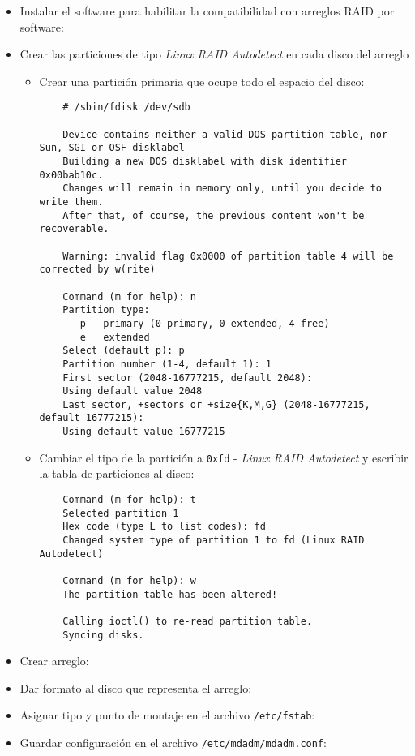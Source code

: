 \begin{itemize}
  \item Instalar el software para habilitar la compatibilidad con arreglos \textsc{RAID} por software:
  \item Crear las particiones de tipo \textit{Linux RAID Autodetect} en cada disco del arreglo
    \begin{itemize}
      \item Crear una partici\'{o}n primaria que ocupe todo el espacio del disco:

{
\scriptsize
\linespread{1}
\begin{verbatim}
    # /sbin/fdisk /dev/sdb

    Device contains neither a valid DOS partition table, nor Sun, SGI or OSF disklabel
    Building a new DOS disklabel with disk identifier 0x00bab10c.
    Changes will remain in memory only, until you decide to write them.
    After that, of course, the previous content won't be recoverable.

    Warning: invalid flag 0x0000 of partition table 4 will be corrected by w(rite)

    Command (m for help): n
    Partition type:
       p   primary (0 primary, 0 extended, 4 free)
       e   extended
    Select (default p): p
    Partition number (1-4, default 1): 1
    First sector (2048-16777215, default 2048):
    Using default value 2048
    Last sector, +sectors or +size{K,M,G} (2048-16777215, default 16777215):
    Using default value 16777215
\end{verbatim}
}

      \item Cambiar el tipo de la partici\'{o}n a \texttt{0xfd} - \textit{Linux RAID Autodetect} y escribir la tabla de particiones al disco:

{
\scriptsize
\linespread{1}
\begin{verbatim}
    Command (m for help): t
    Selected partition 1
    Hex code (type L to list codes): fd
    Changed system type of partition 1 to fd (Linux RAID Autodetect)

    Command (m for help): w
    The partition table has been altered!

    Calling ioctl() to re-read partition table.
    Syncing disks.
\end{verbatim}
}

    \end{itemize}
  \item Crear arreglo:
  \item Dar formato al disco que representa el arreglo:
  \item Asignar tipo y punto de montaje en el archivo \texttt{/etc/fstab}:
  \item Guardar configuraci\'{o}n en el archivo \texttt{/etc/mdadm/mdadm.conf}:
\end{itemize}

